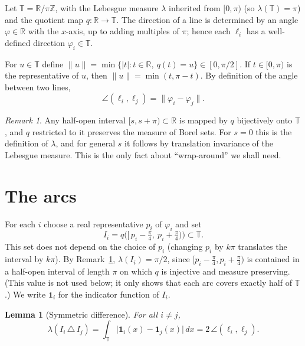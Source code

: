 \documentclass[11pt]{article}
\newtheorem{lemma}[theorem]{Lemma}
\theoremstyle{definition}
\theoremstyle{remark}
\newtheorem{remark}[theorem]{Remark}
\theoremstyle{definition}
\newcommand{\T}{\mathbb{T}}
\begin{document}
Let $\T=\mathbb{R}/\pi\mathbb{Z}$, with the Lebesgue measure $\lambda$ inherited from $[0,\pi)$
(so $\lambda(\T)=\pi$) and the quotient map $q\colon\mathbb{R}\to\T$. The direction of a line
is determined by an angle $\varphi\in\mathbb{R}$ with the $x$-axis, up to adding multiples of
$\pi$; hence each $\ell_i$ has a well-defined direction $\varphi_i\in\T$.

For $u\in\T$ define $\|u\|=\min\{|t| : t\in\mathbb{R},\ q(t)=u\}\in[0,\pi/2]$. If $t\in[0,\pi)$ is
the representative of $u$, then $\|u\|=\min(t,\pi-t)$. By definition of the angle between two
lines,
\begin{equation}\label{eq:angle}
  \angle(\ell_i,\ell_j)=\|\varphi_i-\varphi_j\|.
\end{equation}

\begin{remark}\label{rem:fundamental}
Any half-open interval $[s,s+\pi)\subset\mathbb{R}$ is mapped by $q$ bijectively onto $\T$, and
$q$ restricted to it preserves the measure of Borel sets. For $s=0$ this is the definition of
$\lambda$, and for general $s$ it follows by translation invariance of the Lebesgue measure. This is
the only fact about
``wrap-around'' we shall need.
\end{remark}

\section{The arcs}

For each $i$ choose a real representative $p_i$ of $\varphi_i$ and set
\[
  I_i = q\bigl([\,p_i-\tfrac{\pi}{4},\ p_i+\tfrac{\pi}{4})\bigr)\subset\T .
\]
This set does not depend on the choice of $p_i$ (changing $p_i$ by $k\pi$ translates the interval
by $k\pi$). By Remark~\ref{rem:fundamental}, $\lambda(I_i)=\pi/2$, since
$[p_i-\frac\pi4,p_i+\frac\pi4)$ is contained in a half-open interval of length $\pi$ on which $q$
is injective and measure preserving. (This value is not used below; it only shows that each arc
covers exactly half of $\T$.) We write $\mathbf 1_i$ for the indicator function of $I_i$.

\begin{lemma}[Symmetric difference]\label{lem:symdiff}
For all $i\neq j$,
\[
  \lambda(I_i\,\triangle\, I_j)=\int_{\T}\bigl|\mathbf 1_i(x)-\mathbf 1_j(x)\bigr|\,dx
  = 2\,\angle(\ell_i,\ell_j).
\]
\end{lemma}
\end{document}
